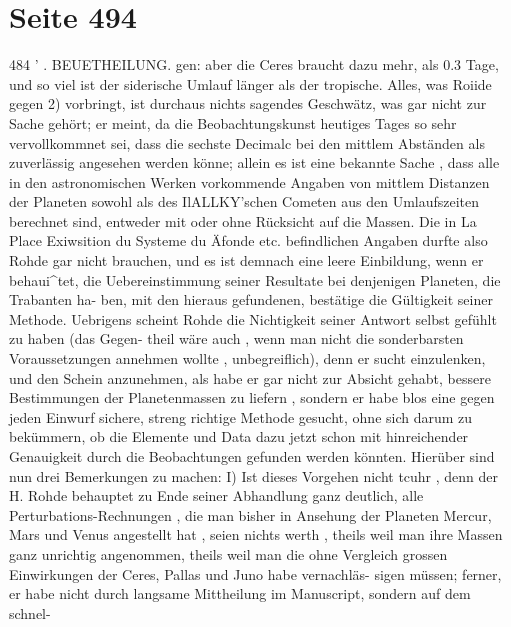 \documentclass[10pt,a4paper]{article}
\begin{document}
\newpage
\section*{Seite 494}

484  '  .  BEUETHEILUNG.
gen:  aber  die  Ceres  braucht  dazu  mehr,  als  0.3  Tage,  und  so  viel  ist  der  siderische  Umlauf  länger  als
der  tropische.
Alles,  was  Roiide  gegen  2)  vorbringt,  ist  durchaus  nichts  sagendes  Geschwätz,  was  gar  nicht
zur  Sache  gehört;  er  meint,  da  die  Beobachtungskunst  heutiges  Tages  so  sehr  vervollkommnet  sei,  dass
die  sechste  Decimalc  bei  den  mittlem  Abständen  als  zuverlässig  angesehen  werden  könne;  allein  es  ist
eine  bekannte  Sache ,  dass  alle  in  den  astronomischen  Werken  vorkommende  Angaben  von  mittlem
Distanzen  der  Planeten  sowohl  als  des  IlALLKY'schen  Cometen  aus  den  Umlaufszeiten  berechnet  sind,
entweder  mit  oder  ohne  Rücksicht  auf  die  Massen.  Die  in  La  Place  Exiwsition  du  Systeme  du  Äfonde  etc.
befindlichen  Angaben  durfte  also  Rohde  gar  nicht  brauchen,  und  es  ist  demnach  eine  leere  Einbildung,
wenn  er  behaui\textasciicircum{}tet,  die  Uebereinstimmung  seiner  Resultate  bei  denjenigen  Planeten,  die  Trabanten  ha-
ben, mit  den  hieraus  gefundenen,  bestätige  die  Gültigkeit  seiner  Methode.
Uebrigens  scheint  Rohde  die  Nichtigkeit  seiner  Antwort  selbst  gefühlt  zu  haben  (das  Gegen-
theil  wäre  auch ,  wenn  man  nicht  die  sonderbarsten  Voraussetzungen  annehmen  wollte ,  unbegreiflich),
denn  er  sucht  einzulenken,  und  den  Schein  anzunehmen,  als  habe  er  gar  nicht  zur  Absicht  gehabt,
bessere  Bestimmungen  der  Planetenmassen  zu  liefern ,  sondern  er  habe  blos  eine  gegen  jeden  Einwurf
sichere,  streng  richtige  Methode  gesucht,  ohne  sich  darum  zu  bekümmern,  ob  die  Elemente  und  Data
dazu  jetzt  schon  mit  hinreichender  Genauigkeit  durch  die  Beobachtungen  gefunden  werden  könnten.
Hierüber  sind  nun  drei  Bemerkungen  zu  machen:
I)  Ist  dieses  Vorgehen  nicht  tcuhr ,  denn  der  H.  Rohde  behauptet  zu  Ende  seiner  Abhandlung
ganz  deutlich,  alle  Perturbations-Rechnungen ,  die  man  bisher  in  Ansehung  der  Planeten  Mercur,  Mars
und  Venus  angestellt  hat ,  seien  nichts  werth ,  theils  weil  man  ihre  Massen  ganz  unrichtig  angenommen,
theils  weil  man  die  ohne  Vergleich  grossen  Einwirkungen  der  Ceres,  Pallas  und  Juno  habe  vernachläs-
sigen müssen;  ferner,  er  habe  nicht  durch  langsame  Mittheilung  im  Manuscript,  sondern  auf  dem  schnel-
\end{document}
